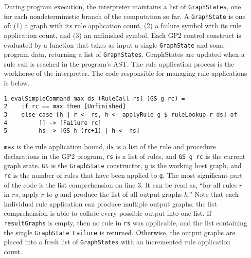 During program execution, the interpreter maintains a list of \texttt{GraphStates}, one for each nondeterministic branch of the computation so far. A \texttt{GraphState} is one of: (1) a graph with its rule application count, (2) a failure symbol with its rule application count, and (3) an unfinished symbol. Each GP2 control construct is evaluated by a function that takes as input a single \texttt{GraphState} and some program data, returning a list of \texttt{GraphStates}. {GraphStates} are updated when a rule call is reached in the program's AST. The rule application process is the workhorse of the interpreter. The code responsible for managing rule applications is below.

\begin{verbatim}
1 evalSimpleCommand max ds (RuleCall rs) (GS g rc) = 
2    if rc == max then [Unfinished]
3    else case [h | r <- rs, h <- applyRule g $ ruleLookup r ds] of
4         [] -> [Failure rc]
5         hs -> [GS h (rc+1) | h <- hs]
\end{verbatim}

\texttt{max} is the rule application bound, \texttt{ds} is a list of the rule and procedure declarations in the GP2 program, \texttt{rs} is a list of rules, and \texttt{GS g rc} is the current graph state. \texttt{GS} is the \texttt{GraphState} constructor, \texttt{g} is the working host graph, and \texttt{rc} is the number of rules that have been applied to \texttt{g}. The most significant part of the code is the list comprehension on line 3. It can be read as, ``for all rules $r$ in $rs$, apply $r$ to $g$ and produce the list of all output graphs $h$.'' Note that each individual rule application can produce multiple output graphs; the list comprehension is able to collate every possible output into one list. If \texttt{resultGraphs} is empty, then no rule in \texttt{rs} was applicable, and the list containing the single \texttt{GraphState Failure} is returned. Otherwise, the output graphs are placed into a fresh list of \texttt{GraphStates} with an incremented rule application count.

